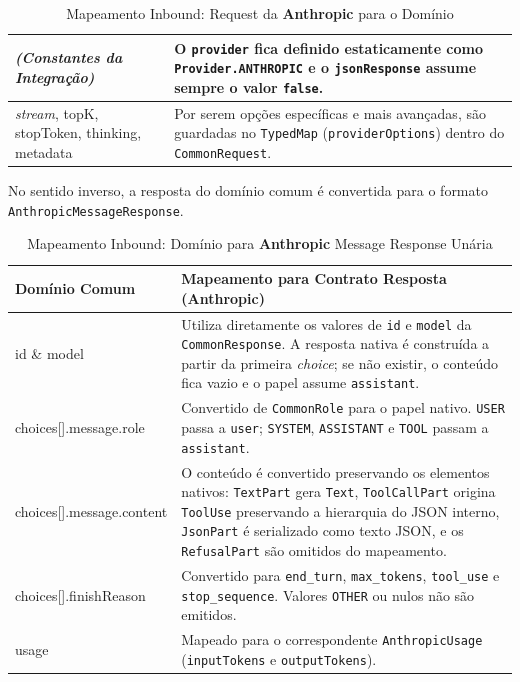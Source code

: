 \begin{table}[H]
\begin{tabularx}{\textwidth}{|>{\ttfamily\raggedright\arraybackslash}p{4.5cm}|Y|}
        \hline
        \normalfont\textit{(Constantes da Integração)} & O \texttt{provider} fica definido estaticamente como \texttt{Provider.ANTHROPIC} e o \texttt{jsonResponse} assume sempre o valor \texttt{false}. \\
        \hline
        \textit{stream}, topK, stopToken, thinking, metadata & Por serem opções específicas e mais avançadas, são guardadas no \texttt{TypedMap} (\texttt{providerOptions}) dentro do \texttt{CommonRequest}. \\
        \hline
    \end{tabularx}
    \caption{Mapeamento Inbound: Request da \textbf{Anthropic} para o Domínio}
\end{table}

No sentido inverso, a resposta do domínio comum é convertida para o formato \texttt{Anthropic\allowbreak{}Message\allowbreak{}Response}.


\begin{table}[H]
    \centering
    \footnotesize
    \renewcommand{\arraystretch}{1.25}
    \begin{tabularx}{\textwidth}{|>{\ttfamily\raggedright\arraybackslash}p{4cm}|Y|}
        \hline
        \textbf{Domínio Comum} & \textbf{Mapeamento para Contrato Resposta (Anthropic)} \\
        \hline
        id \& model & Utiliza diretamente os valores de \texttt{id} e \texttt{model} da \texttt{CommonResponse}. A resposta nativa é construída a partir da primeira \textit{choice}; se não existir, o conteúdo fica vazio e o papel assume \texttt{assistant}. \\
        \hline
        choices[].message.role & Convertido de \texttt{CommonRole} para o papel nativo. \texttt{USER} passa a \texttt{user}; \texttt{SYSTEM}, \texttt{ASSISTANT} e \texttt{TOOL} passam a \texttt{assistant}. \\
        \hline
        choices[].message.content & O conteúdo é convertido preservando os elementos nativos: \texttt{TextPart} gera \texttt{Text}, \texttt{ToolCallPart} origina \texttt{ToolUse} preservando a hierarquia do JSON interno, \texttt{JsonPart} é serializado como texto JSON, e os \texttt{RefusalPart} são omitidos do mapeamento. \\
        \hline
        choices[].finishReason & Convertido para \texttt{end\_turn}, \texttt{max\_tokens}, \texttt{tool\_use} e \texttt{stop\_sequence}. Valores \texttt{OTHER} ou nulos não são emitidos. \\
        \hline
        usage & Mapeado para o correspondente \texttt{AnthropicUsage} (\texttt{inputTokens} e \texttt{outputTokens}). \\
        \hline
    \end{tabularx}
\caption{Mapeamento Inbound: Domínio para \textbf{Anthropic} Message Response Unária}
\end{table}

